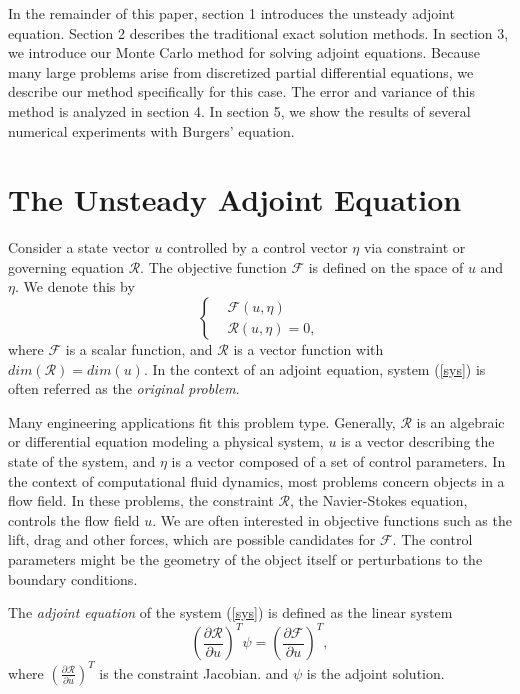 \documentclass{elsart}
\theoremstyle{remark}
\theoremstyle{definition}
\theoremstyle{proof}
\begin{document}
    In the remainder of this paper, section 1 introduces the unsteady adjoint
    equation.  Section 2 describes the traditional exact solution methods.  In
    section 3, we introduce our Monte Carlo method for solving adjoint
    equations.  Because many large problems arise from discretized partial
    differential equations, we describe our method specifically for this case.
    The error and variance of this method is analyzed in section 4.  In
    section 5, we show the results of several numerical experiments with
    Burgers' equation.





\section{The Unsteady Adjoint Equation}
    Consider a state vector $u$ controlled by a control vector $\eta$
    via constraint or governing equation $\mathcal{R}$.  The objective function
    $\mathcal{F}$ is defined on the space of $u$ and $\eta$.  We denote this by
    \begin{equation} \label{sys} \left\{ \begin{aligned}
        & \mathcal{F}(u,\eta) \\
        & \mathcal{R}(u,\eta) = 0 ,
    \end{aligned} \right. \end{equation}
    where $\mathcal{F}$ is a scalar function, and $\mathcal{R}$ is a
    vector function with $dim(\mathcal{R}) = dim(u)$.  In the context of
    an adjoint equation, system (\ref{sys}) is often referred as the
    \emph{original problem}.
    
    Many engineering applications fit this problem type.  Generally,
    $\mathcal{R}$ is an algebraic or differential equation modeling a
    physical system, $u$ is a vector describing the state of the system,
    and $\eta$ is a vector composed of a set of control parameters.  In
    the context of computational fluid dynamics, most problems concern
    objects in a flow field.  In these problems, the constraint
    $\mathcal{R}$, the Navier-Stokes equation, controls the flow field
    $u$.  We are often interested in objective functions such as
    the lift, drag and other forces, which are possible candidates for
    $\mathcal{F}$.  The control parameters might be the geometry of the
    object itself or perturbations to the boundary conditions.
    
    The \emph{adjoint equation} of the system (\ref{sys}) is defined as the
    linear system
    \begin{equation} \label{adj}
          \left( \frac{\partial\mathcal{R}}{\partial u} \right)^T \psi
        = \left( \frac{\partial\mathcal{F}}{\partial u} \right)^T ,
    \end{equation}
    where $\left( \frac{\partial\mathcal{R}}{\partial u} \right)^T$ is the
    constraint Jacobian.  and $\psi$ is the adjoint solution.
    
\end{document}
